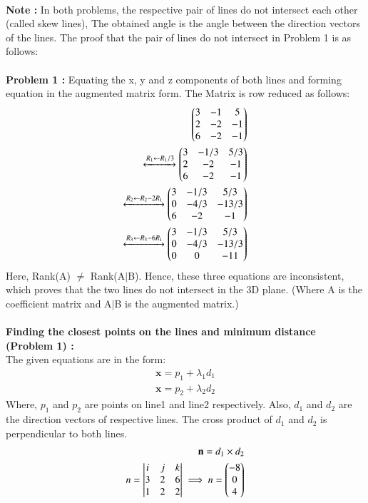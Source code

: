 \documentclass[journal,12pt,twocolumn]{IEEEtran}
\begin{document}
\\
\textbf{Note :} In both problems, the respective pair of lines do not intersect each other (called skew lines), The obtained angle is the angle between the direction vectors of the lines. The proof that the pair of lines do not intersect in Problem 1 is as follows:\\
\\
\textbf{Problem 1 :} Equating the x, y and z components of both lines and forming equation in the augmented matrix form. The Matrix is row reduced as follows:
\begin{align}
\begin{pmatrix}3 & -1 & 5\\2 & -2 & -1\\6 &-2&-1\end{pmatrix}\\
\xleftrightarrow[]{R_1\leftarrow R_1/3}
\begin{pmatrix}3 & -1/3 & 5/3 \\2 & -2 & -1\\6 &-2&-1\end{pmatrix}\\
\xleftrightarrow[]{R_2\leftarrow R_2-2R_1}   
\begin{pmatrix}3 & -1/3 & 5/3\\0 & -4/3 & -13/3\\6 &-2&-1\end{pmatrix}\\
\xleftrightarrow[]{R_3\leftarrow R_3-6R_1}
\begin{pmatrix}3 & -1/3 & 5/3\\0 & -4/3 & -13/3\\0 &0&-11\end{pmatrix}
\end{align} 
Here, Rank(A) $\neq$ Rank(A$\mid$B). Hence, these three equations are inconsistent, which proves that the two lines do not intersect in the 3D plane. (Where A is the coefficient matrix and A$\mid$B is the augmented matrix.) \\
\\
\textbf{Finding the closest points on the lines and minimum distance (Problem 1) :}
\\
The given equations are in the form:
\begin{align}
    \textbf{x}=p_1 + \lambda_1d_1\\
    \textbf{x}=p_2 + \lambda_2d_2
\end{align}
Where, $p_1$ and $p_2$ are points on line1 and line2 respectively. Also, $d_1$ and $d_2$ are the direction vectors of respective lines.
The cross product of $d_1$ and $d_2$ is perpendicular to both lines.
\begin{align}
    \mathbf{n} = d_1 \times d_2\\
     n=\begin{vmatrix}i & j & k\\3 &2 &6\\1&2&2\end{vmatrix}
     \implies n=\begin{pmatrix}-8 \\ 0 \\ 4\end{pmatrix}
\end{align}
\end{document}
